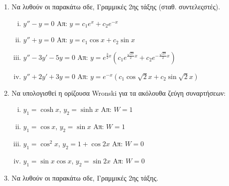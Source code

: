 



\everymath{\displaystyle}
\thispagestyle{empty}





\begin{center}
\end{center}

\vspace{\baselineskip}

\begin{enumerate}

\item Να λυθούν οι παρακάτω σδε, Γραμμικές 2ης τάξης (σταθ. συντελεςστές).

\begin{enumerate}[i)]

\item $y''-y=0$ \hfill Απ: $y=c_1e^x+c_2e^{-x}$
\item $y''+y=0$ \hfill Απ: $y=c_1\cos x+c_2\sin x$
\item $y''-3y'-5y=0$ \hfill Απ: $y=e^{\frac{3}{2}x}(c_1e^{\frac{\sqrt{29}}{2}x}+c_2e^{-\frac{\sqrt{29}}{2}x})$
\item $y''+2y'+3y=0$ \hfill Απ: $y=e^{-x}(c_1\cos\sqrt{2}x+c_2\sin\sqrt{2}x)$

\end{enumerate}

\item Να υπολογισθεί η ορίζουσα \textlatin{Wronski} για τα ακόλουθα ζεύγη συναρτήσεων:

\begin{enumerate}[i)]

\item $y_1=\cosh x$, $y_2=\sinh x$ \hfill Απ: $W=1$
\item $y_1=\cos x$,  $y_2=\sin x$ \hfill Απ: $W=1$
\item $y_1=\cos^2x$, $y_2=1+\cos 2x$ \hfill Απ: $W=0$
\item $y_1=\sin x\cos x$, $y_2=\sin 2x$ \hfill Απ: $W=0$

\end{enumerate}

\item Να λυθούν οι παρακάτω σδε, Γραμμικές 2ης τάξης.


\end{enumerate}
